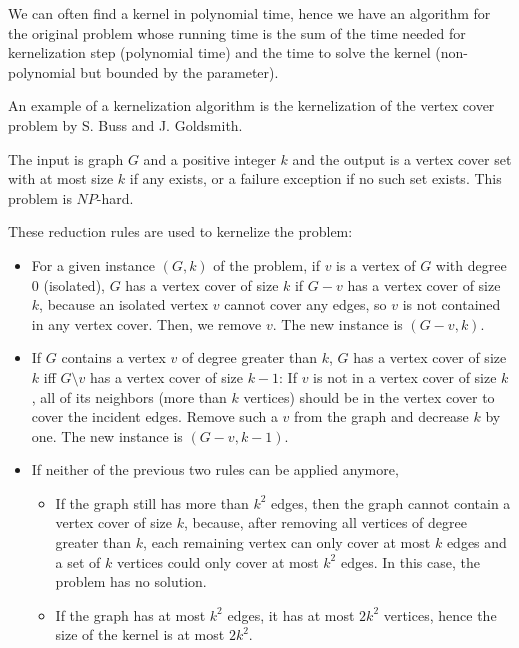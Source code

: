 \documentclass{beamer}
\begin{document}
{\begin{defi}
\begin{defi}
\end{defi}




We can often find a kernel in polynomial time, hence we have an algorithm for the original problem whose running time is the sum of the time needed for kernelization step (polynomial time) and the time to solve the kernel (non-polynomial but bounded by the parameter).

\vspace{1cm}
\begin{exam}
An example of a kernelization algorithm is the kernelization of
the vertex cover problem by S. Buss and J. Goldsmith\cite{buss}. 

The input is graph $G$ and a positive integer 
$k$ and the output is a vertex cover set with at most size $k$ if any exists, or
a failure exception if no such set exists. This problem is $NP$-hard. 

These reduction rules are used to kernelize the problem:

\begin{itemize}
\item For a given instance $(G,k)$ of the problem, if $v$ is a vertex of $G$ with degree $0$ (isolated), $G$ has a vertex cover of size $k$ if $G-v$ has a vertex cover of size $k$, because an isolated vertex $v$ cannot cover any edges, so $v$ is not contained in any vertex cover. Then, we remove $v$. The new instance is $(G - v , k)$.


\item If $G$ contains a vertex $v$ of degree greater than $k$, $G$ has a vertex cover of size $k$ iff $G\setminus v$ has a vertex cover of size $k - 1$: If $v$ is not in a vertex cover of size $k$, all of its neighbors (more than $k$ vertices) should be in the vertex cover to cover the incident edges. Remove such a $v$ from the graph and decrease $k$ by one. The new instance is $(G - v , k - 1)$.

\item If neither of the previous two rules can be applied anymore,
\begin{itemize}
\item If the graph still has more than $k^2$ edges, then the graph cannot contain a vertex cover of size $k$, because, after  removing all vertices of degree greater than 
$k$, each remaining vertex can only cover at most $k$ edges and a set of
$k$ vertices could only cover at most $k^2$ edges. In this case, the problem has no solution.

\item If the graph has at most $k^2$ edges, it has at most $2 k^2$ vertices, hence the size of the kernel is at most $2 k^2$.
\end{itemize}


\end{itemize}
\end{exam}
\end{defi}}
\end{document}
